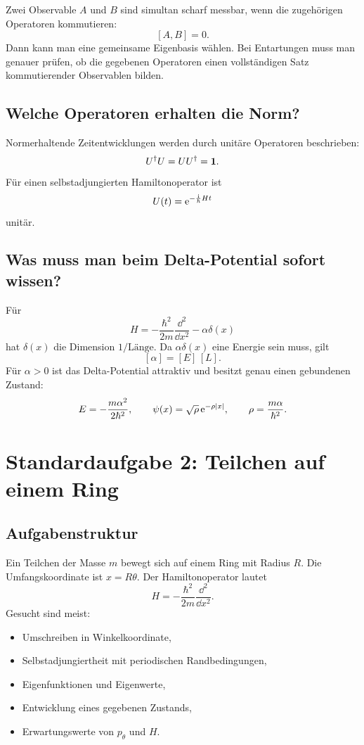 \begin{answerbox}
Zwei Observable $A$ und $B$ sind simultan scharf messbar, wenn die zugehörigen Operatoren kommutieren:
\[
    [A,B]=0.
\]
Dann kann man eine gemeinsame Eigenbasis wählen. Bei Entartungen muss man genauer prüfen, ob die gegebenen Operatoren einen vollständigen Satz kommutierender Observablen bilden.
\end{answerbox}

\subsection{Welche Operatoren erhalten die Norm?}

\begin{answerbox}
Normerhaltende Zeitentwicklungen werden durch unitäre Operatoren beschrieben:
\[
    U^\dagger U=UU^\dagger=\mathbf{1}.
\]
Für einen selbstadjungierten Hamiltonoperator ist
\[
    U(t)=\mathrm{e}^{-\frac{\mathrm{i}}{\hbar}Ht}
\]
unitär.
\end{answerbox}

\subsection{Was muss man beim Delta-Potential sofort wissen?}

Für
\[
    H=-\frac{\hbar^2}{2m}\frac{\dd^2}{\dd x^2}-\alpha\delta(x)
\]
hat $\delta(x)$ die Dimension $1/\text{Länge}$. Da $\alpha\delta(x)$ eine Energie sein muss, gilt
\[
    [\alpha]=[E]\,[L].
\]
Für $\alpha>0$ ist das Delta-Potential attraktiv und besitzt genau einen gebundenen Zustand:
\[
    E=-\frac{m\alpha^2}{2\hbar^2},
    \qquad
    \psi(x)=\sqrt{\rho}\,\mathrm{e}^{-\rho|x|},
    \qquad
    \rho=\frac{m\alpha}{\hbar^2}.
\]

\section{Standardaufgabe 2: Teilchen auf einem Ring}

\subsection{Aufgabenstruktur}

Ein Teilchen der Masse $m$ bewegt sich auf einem Ring mit Radius $R$. Die Umfangskoordinate ist $x=R\theta$. Der Hamiltonoperator lautet
\[
    H=-\frac{\hbar^2}{2m}\frac{\dd^2}{\dd x^2}.
\]
Gesucht sind meist:
\begin{itemize}
    \item Umschreiben in Winkelkoordinate,
    \item Selbstadjungiertheit mit periodischen Randbedingungen,
    \item Eigenfunktionen und Eigenwerte,
    \item Entwicklung eines gegebenen Zustands,
    \item Erwartungswerte von $p_\theta$ und $H$.
\end{itemize}

